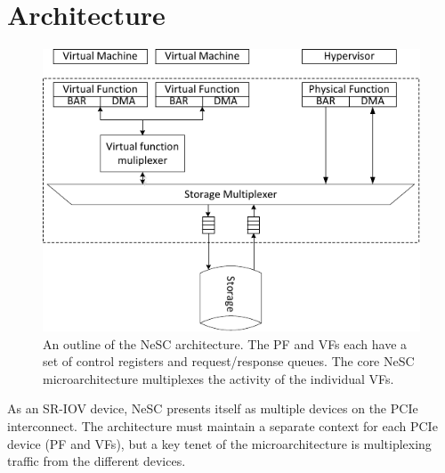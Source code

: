 \section{Architecture}
\label{sec:arch}

\begin{figure}[t]
  \centering
  \includegraphics[width=1\columnwidth]{figs/architecture.pdf}
  \caption{An outline of the NeSC architecture. The PF and VFs each have a set of control registers and request/response queues. The core NeSC microarchitecture multiplexes the activity of the individual VFs.}
  \label{fig:architecture}
\end{figure}



%

As an SR-IOV device, NeSC presents itself as multiple devices on the PCIe interconnect. The architecture must maintain a separate context for each PCIe device (PF and VFs), but a key tenet of the microarchitecture is multiplexing traffic from the different devices.

